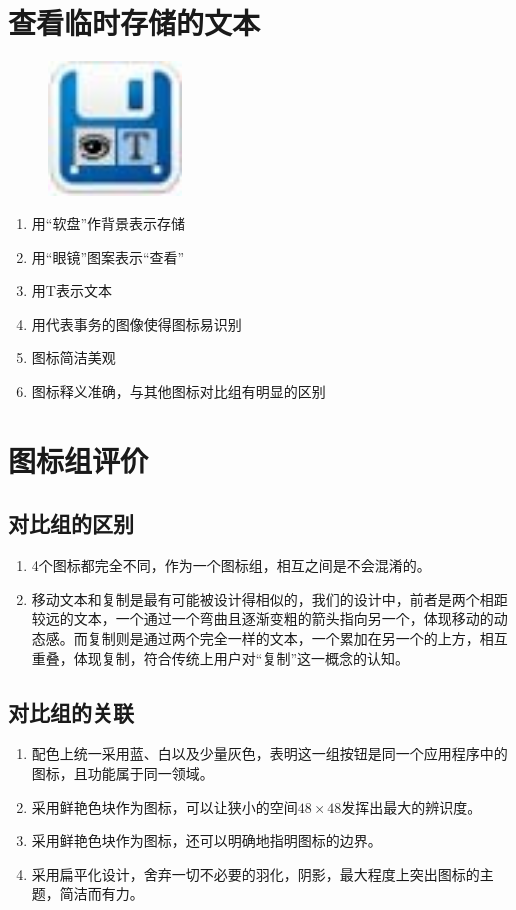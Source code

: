 ﻿\documentclass{beamer}
\begin{document}
\section{查看临时存储的文本}
\begin{frame}
  \begin{figure}[H]
  \includegraphics[width=1.4in]{img/4.jpg}
  \end{figure}
\end{frame}
\begin{frame}
  \begin{enumerate}
  \item 用“软盘”作背景表示存储
  \item 用“眼镜”图案表示“查看”
  \item 用T表示文本
  \item 用代表事务的图像使得图标易识别
  \item 图标简洁美观
  \item 图标释义准确，与其他图标对比组有明显的区别
  \end{enumerate}
\end{frame}


\section{图标组评价}
\subsection{对比组的区别}
\begin{frame}
\begin{enumerate}
\item 4个图标都完全不同，作为一个图标组，相互之间是不会混淆的。\pause
\item 移动文本和复制是最有可能被设计得相似的，我们的设计中，前者是两个相距较远的文本，一个通过一个弯曲且逐渐变粗的箭头指向另一个，体现移动的动态感。而复制则是通过两个完全一样的文本，一个累加在另一个的上方，相互重叠，体现复制，符合传统上用户对“复制”这一概念的认知。
\end{enumerate}
\end{frame}
\subsection{对比组的关联}
\begin{frame}
\begin{enumerate}
\item 配色上统一采用蓝、白以及少量灰色，表明这一组按钮是同一个应用程序中的图标，且功能属于同一领域。\pause
\item 采用鲜艳色块作为图标，可以让狭小的空间$48\times48$发挥出最大的辨识度。\pause
\item 采用鲜艳色块作为图标，还可以明确地指明图标的边界。\pause
\item 采用扁平化设计，舍弃一切不必要的羽化，阴影，最大程度上突出图标的主题，简洁而有力。
\end{enumerate}
\end{frame}
\end{document}
